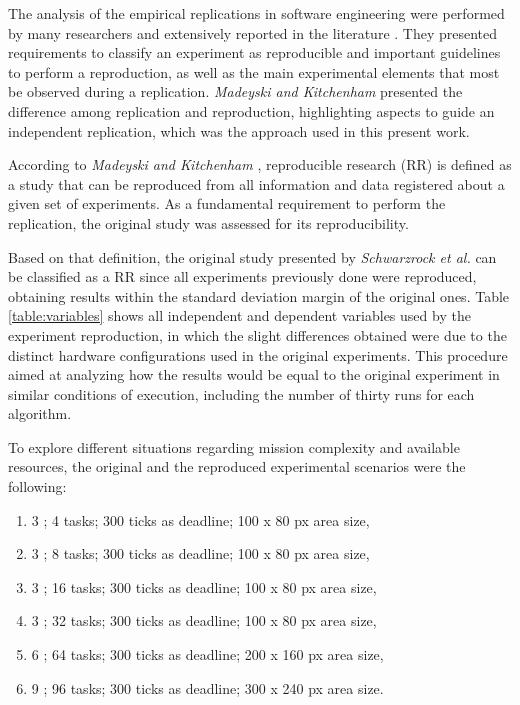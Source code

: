 The analysis of the empirical replications in software engineering were performed by many researchers and extensively reported in the literature \cite{exp05, exp04, exp03, exp01}. They presented requirements to classify an experiment as reproducible and important guidelines to perform a reproduction, as well as the main experimental elements that most be observed during a replication. \textit{Madeyski and Kitchenham} \cite{exp02} presented the difference among replication and reproduction, highlighting aspects to guide an independent replication, which was the approach used in this present work.

According to \textit{Madeyski and Kitchenham} \cite{exp02}, reproducible research (RR) is defined as a study that can be reproduced from all information and data registered about a given set of experiments. As a fundamental requirement to perform the replication, the original study was assessed for its reproducibility.

Based on that definition, the original study presented by \textit{Schwarzrock et al.} \cite{MAS07} can be classified as a RR since all experiments previously done were reproduced, obtaining results within the standard deviation margin of the original ones. Table \ref{table:variables} shows all independent and dependent variables used by the experiment reproduction, in which the slight differences obtained were due to the distinct hardware configurations used in the original experiments. This procedure aimed at analyzing how the results would be equal to the original experiment in similar conditions of execution, including the number of thirty runs for each algorithm.

To explore different situations regarding mission complexity and available resources, the original and the reproduced experimental scenarios were the following:

\begin{enumerate}
	\item 3 \uavs; 4 tasks; 300 ticks as deadline; 100 x 80 px area size, \label{case:4tasks}
	\item 3 \uavs; 8 tasks; 300 ticks as deadline; 100 x 80 px area size, \label{case:8tasks}
	\item 3 \uavs; 16 tasks; 300 ticks as deadline; 100 x 80 px area size, \label{case:16tasks}
	\item 3 \uavs; 32 tasks; 300 ticks as deadline; 100 x 80 px area size, \label{case:32tasks}
	\item 6 \uavs; 64 tasks; 300 ticks as deadline; 200 x 160 px area size, \label{case:64tasks}
	\item 9 \uavs; 96 tasks; 300 ticks as deadline; 300 x 240 px area size. \label{case:96tasks}
\end{enumerate}


